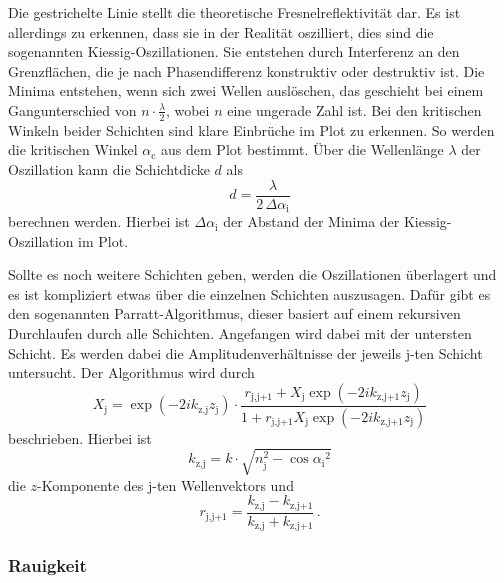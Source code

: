 Die gestrichelte Linie stellt die theoretische Fresnelreflektivität dar.
Es ist allerdings zu erkennen, dass sie in der Realität oszilliert, dies sind die sogenannten Kiessig-Oszillationen. 
Sie entstehen durch Interferenz an den Grenzflächen, die je nach Phasendifferenz konstruktiv oder destruktiv ist.
Die Minima entstehen, wenn sich zwei Wellen auslöschen, das geschieht bei einem Gangunterschied von $ n \cdot \frac{\lambda}{2}$, wobei $n$ eine ungerade Zahl ist.
Bei den kritischen Winkeln beider Schichten sind klare Einbrüche im Plot zu erkennen.
So werden die kritischen Winkel $\alpha _\text{c}$ aus dem Plot bestimmt.
Über die Wellenlänge $\lambda$ der Oszillation kann die Schichtdicke $d$ als 
\begin{equation}
    d = \frac{\lambda}{2 \, \Delta \alpha _\text{i}}
    \label{eq:schicht}
\end{equation}
berechnen werden.
Hierbei ist $\Delta \alpha _\text{i}$ der Abstand der Minima der Kiessig-Oszillation im Plot.

Sollte es noch weitere Schichten geben, werden die Oszillationen überlagert und es ist kompliziert etwas über die einzelnen Schichten auszusagen.
Dafür gibt es den sogenannten Parratt-Algorithmus, dieser basiert auf einem rekursiven Durchlaufen durch alle Schichten.
Angefangen wird dabei mit der untersten Schicht.
Es werden dabei die Amplitudenverhältnisse der jeweils j-ten Schicht untersucht.
Der Algorithmus wird durch 
\begin{equation}
    X_\text{j} =  \exp(-2 i k_\text{z,j} z_\text{j}) \cdot  \frac{r_\text{j,j+1} + X_\text{j} \exp(-2 i k_\text{z,j+1} z_\text{j})}
    {1 + r_\text{j,j+1} X_\text{j} \exp(-2 i k_\text{z,j+1} z_\text{j})}
    \label{eq:parratt}
\end{equation}
beschrieben.
Hierbei ist 
\begin{equation}
    k_\text{z,j} = k \cdot \sqrt{n_\text{j}^2 -  {\cos{\alpha _\text{i}}}^2}
    \label{eq:k}
\end{equation}
die $z$-Komponente des j-ten Wellenvektors und 
\begin{equation}
    r_\text{j,j+1} = \frac{k_\text{z,j} - k_\text{z,j+1}}{k_\text{z,j} + k_\text{z,j+1}} \,.
    \label{eq:k}
\end{equation}

\subsubsection{Rauigkeit}

